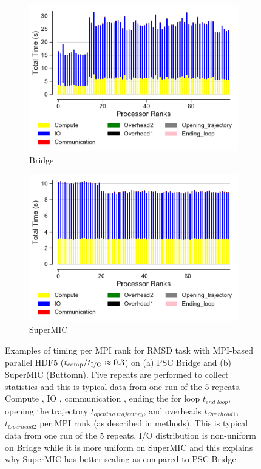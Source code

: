 \begin{figure}[ht!]
\centering
\begin{subfigure}{.45\textwidth}
  \includegraphics[width=\linewidth]{figures/Bridge-MPI-IO-BarPlot-rank-comparison_78_5.pdf}
  \caption{Bridge}
  \label{fig:hdf5-bridge}
\end{subfigure}
\bigskip
\begin{subfigure} {.45\textwidth}
  \includegraphics[width=\linewidth]{figures/SuperMIC-MPI-IO-BarPlot-rank-comparison_80_5.pdf}
  \caption{SuperMIC}
  \label{fig:hdf5-SuperMIC}
\end{subfigure}
%
\caption{Examples of timing per MPI rank for RMSD task with MPI-based parallel HDF5 (${t}_{\text{comp}}/{t}_{\text{I/O}} \approx 0.3$) on (a) PSC Bridge and (b) SuperMIC (Buttomn).
Five repeats are performed to collect statistics and this is typical data from one run of the 5 repeats. Compute \tcomp, IO \tIO, communication \tcomm, ending the for loop $t_{end\_loop}$,
opening the trajectory $t_{opening\_trajectory}$, and overheads $t_{Overhead1}$,  $t_{Overhead2}$ per MPI rank (as described in methods).
This is typical data from one run of the 5 repeats. I/O distribution is non-uniform on Bridge while it is more uniform on SuperMIC and this explains why SuperMIC has better scaling as compared to PSC Bridge.}
\label{fig:MPIwithIO-clusters-rank}
\end{figure} 

